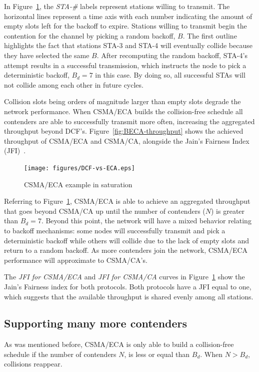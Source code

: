 \documentclass[a4paper,journal]{IEEEtran}
\begin{document}
In Figure~\ref{fig:BECA}, the \emph{STA-\#} labels represent stations willing to transmit. The horizontal lines represent a time axis with each number indicating the amount of empty slots left for the backoff to expire. Stations willing to transmit begin the contention for the channel by picking a random backoff, $B$. The first outline highlights the fact that stations STA-3 and STA-4 will eventually collide because they have selected the same $B$. After recomputing the random backoff, STA-4's attempt results in a successful transmission, which instructs the node to pick a deterministic backoff, $B_{d}=7$ in this case. By doing so, all successful STAs will not collide among each other in future cycles.

Collision slots being orders of magnitude larger than empty slots degrade the network performance. When CSMA/ECA builds the collision-free schedule all contenders are able to successfully transmit more often, increasing the aggregated throughput beyond DCF's. Figure~\ref{fig:BECA-throughput} shows the achieved throughput of CSMA/ECA and CSMA/CA, alongside the Jain's Fairness Index (JFI)~\cite{JFI}.

\begin{figure}[htbp]
\centering
  \texttt{[image: figures/DCF-vs-ECA.eps]}
  \caption{CSMA/ECA example in saturation}
  \label{fig:BECA}
\end{figure}

Referring to Figure~\ref{fig:BECA}, CSMA/ECA is able to achieve an aggregated throughput that goes beyond CSMA/CA up until the number of contenders ($N$) is greater than $B_{d}=7$. Beyond this point, the network will have a mixed behavior relating to backoff mechanisms: some nodes will successfully transmit and pick a deterministic backoff while others will collide due to the lack of empty slots and return to a random backoff. As more contenders join the network, CSMA/ECA performance will approximate to CSMA/CA's.

The \emph{JFI for CSMA/ECA} and \emph{JFI for CSMA/CA} curves in Figure~\ref{fig:BECA} show the Jain's Fairness index for both protocols. Both protocols have a JFI equal to one, which suggests that the available throughput is shared evenly among all stations.

	\subsection{Supporting many more contenders}\label{moreContenders}
	As was mentioned before, CSMA/ECA is only able to build a collision-free schedule if the number of contenders $N$, is less or equal than $B_{d}$. When $N > B_{d}$, collisions reappear. 
	
\end{document}
